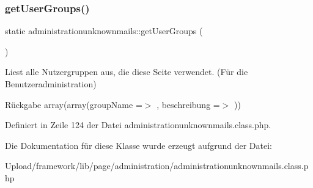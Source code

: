 \mbox{\label{classadministrationunknownmails_a5d216f33c4d95136fbcd4f9fea40281b}} 
\subsubsection{\texorpdfstring{get\+User\+Groups()}{getUserGroups()}}
{\footnotesize\ttfamily static administrationunknownmails\+::get\+User\+Groups (\begin{DoxyParamCaption}{ }\end{DoxyParamCaption})\hspace{0.3cm}{\ttfamily [static]}}

Liest alle Nutzergruppen aus, die diese Seite verwendet. (Für die Benutzeradministration) \begin{DoxyReturn}{Rückgabe}
array(array(\textquotesingle{}group\+Name\textquotesingle{} =$>$ \textquotesingle{}\textquotesingle{}, \textquotesingle{}beschreibung\textquotesingle{} =$>$ \textquotesingle{}\textquotesingle{})) 
\end{DoxyReturn}


Definiert in Zeile 124 der Datei administrationunknownmails.\+class.\+php.



Die Dokumentation für diese Klasse wurde erzeugt aufgrund der Datei\+:\begin{DoxyCompactItemize}
\item 
Upload/framework/lib/page/administration/administrationunknownmails.\+class.\+php\end{DoxyCompactItemize}
